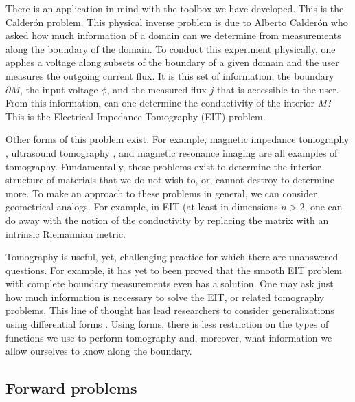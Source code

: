 There is an application in mind with the toolbox we have developed. This is the Calder\'on problem. This physical inverse problem is due to  Alberto Calder\'on who asked how much information of a domain can we determine from measurements along the boundary of the domain. To conduct this experiment physically, one applies a voltage along subsets of the boundary of a given domain and the user measures the outgoing current flux. It is this set of information, the boundary $\partial M$, the input voltage $\phi$, and the measured flux $j$ that is accessible to the user. From this information, can one determine the conductivity of the interior $M$? This is the Electrical Impedance Tomography (EIT) problem. 

Other forms of this problem exist. For example, magnetic impedance tomography , ultrasound tomography , and magnetic resonance imaging are all examples of tomography.  Fundamentally, these problems exist to determine the interior structure of materials that we do not wish to, or, cannot destroy to determine more. To make an approach to these problems in general, we can consider geometrical analogs. For example, in EIT (at least in dimensions $n>2$, one can do away with the notion of the conductivity by replacing the matrix with an intrinsic Riemannian metric. 

Tomography is useful, yet, challenging practice for which there are unanswered questions. For example, it has yet to been proved that the smooth EIT problem with complete boundary measurements even has a solution.  One may ask just how much information is necessary to solve the EIT, or related tomography problems. This line of thought has lead researchers to consider generalizations using differential forms . Using forms, there is less restriction on the types of functions we use to perform tomography and, moreover, what information we allow ourselves to know along the boundary. 

\subsection{Forward problems}
\label{subsec:forward_problems}
